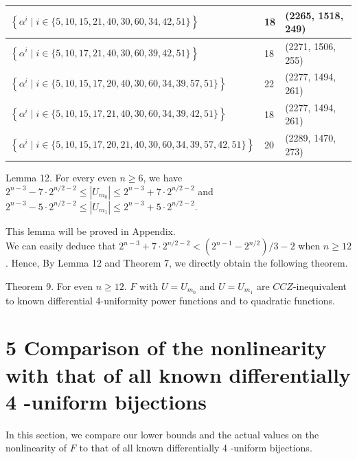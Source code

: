 \documentclass[10pt]{article}
\begin{document}
\begin{table}[h]
\begin{center}
\begin{tabular}{|l|l|l|}
\hline
$\left\{\alpha^{i} \mid i \in\{5,10,15,21,40,30,60,34,42,51\}\right\}$ & 18 & (2265, 1518, 249) \\
\hline
$\left\{\alpha^{i} \mid i \in\{5,10,17,21,40,30,60,39,42,51\}\right\}$ & 18 & (2271, 1506, 255) \\
\hline
$\left\{\alpha^{i} \mid i \in\{5,10,15,17,20,40,30,60,34,39,57,51\}\right\}$ & 22 & (2277, 1494, 261) \\
\hline
$\left\{\alpha^{i} \mid i \in\{5,10,15,17,21,40,30,60,34,39,42,51\}\right\}$ & 18 & (2277, 1494, 261) \\
\hline
$\left\{\alpha^{i} \mid i \in\{5,10,15,17,20,21,40,30,60,34,39,57,42,51\}\right\}$ & 20 & (2289, 1470, 273) \\
\hline
\end{tabular}
\end{center}
\end{table}

Lemma 12. For every even $n \geq 6$, we have $2^{n-3}-7 \cdot 2^{n / 2-2} \leq\left|U_{m_{0}}\right| \leq 2^{n-3}+7 \cdot 2^{n / 2-2}$ and $2^{n-3}-5 \cdot 2^{n / 2-2} \leq\left|U_{m_{1}}\right| \leq 2^{n-3}+5 \cdot 2^{n / 2-2}$.

This lemma will be proved in Appendix.\\
We can easily deduce that $2^{n-3}+7 \cdot 2^{n / 2-2}<\left(2^{n-1}-2^{n / 2}\right) / 3-2$ when $n \geq 12$. Hence, By Lemma 12 and Theorem 7, we directly obtain the following theorem.

Theorem 9. For even $n \geq 12$. $F$ with $U=U_{m_{0}}$ and $U=U_{m_{1}}$ are $C C Z$-inequivalent to known differential 4-uniformity power functions and to quadratic functions.

\section*{5 Comparison of the nonlinearity with that of all known differentially 4 -uniform bijections}
In this section, we compare our lower bounds and the actual values on the nonlinearity of $F$ to that of all known differentially 4 -uniform bijections.
\end{document}
